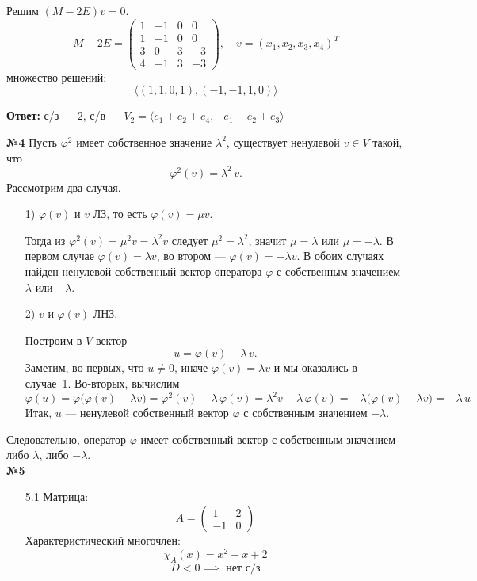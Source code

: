 \documentclass[a4paper]{article}
\begin{document}
\begin{enumerate}
\begin{enumerate}
    Решим \((M-2E)v=0\).  
    \[
    M-2E = 
    \begin{pmatrix}
    1 & -1 & 0 & 0\\
    1 & -1 & 0 & 0\\
    3 &  0 & 3 & -3\\
    4 & -1 & 3 & -3
    \end{pmatrix},
    \quad
    v=(x_1,x_2,x_3,x_4)^T
    \]
    множество решений:
    $$\langle (1, 1, 0, 1), (-1, -1, 1, 0)\rangle$$

    \textbf{Ответ: } с/з --- $2$, с/в --- $V_2 = \langle e_1 + e_2 + e_4, -e_1-e_2+e_3 \rangle$\\


   \end{enumerate}

    \textbf{№4} Пусть \(\varphi^2\) имеет собственное значение \(\lambda^2\), существует ненулевой \(v\in V\) такой, что
    \[
    \varphi^2(v) = \lambda^2\,v.
    \]
    Рассмотрим два случая.
    \begin{enumerate}
      \item[1)]\(\varphi(v)\) и \(v\) ЛЗ, то есть \(\varphi(v)=\mu v\).  
   
      Тогда из \(\varphi^2(v)=\mu^2v=\lambda^2v\) следует \(\mu^2=\lambda^2\), значит \(\mu=\lambda\) или \(\mu=-\lambda\).  
      В первом случае \(\varphi(v)=\lambda v\), во втором — \(\varphi(v)=-\lambda v\).  
      В обоих случаях найден ненулевой собственный вектор оператора \(\varphi\) с собственным значением \(\lambda\) или \(-\lambda\).
    
      \item[2)] \(v\) и \(\varphi(v)\) ЛНЗ. 
      
      Построим в \(V\) вектор
      \[
      u = \varphi(v) - \lambda\,v.
      \]
      Заметим, во‑первых, что \(u\neq0\), иначе \(\varphi(v)=\lambda v\) и мы оказались в случае 1.  
      Во‑вторых, вычислим
      \[
      \varphi(u)
      = \varphi\bigl(\varphi(v) - \lambda v\bigr)
      = \varphi^2(v)-\lambda\,\varphi(v)
      = \lambda^2v - \lambda\,\varphi(v)
      = -\lambda\bigl(\varphi(v)-\lambda v\bigr)
      = -\lambda\,u
      \]
      Итак, \(u\) — ненулевой собственный вектор \(\varphi\) с собственным значением \(-\lambda\).
    \end{enumerate}
    Следовательно, оператор \(\varphi\) имеет собственный вектор с собственным значением либо \(\lambda\), либо \(-\lambda\).\\

    \textbf{№5}\begin{enumerate}
      \item[5.1]Матрица:
      \[
      A = \begin{pmatrix}
      1 & 2\\
      -1 & 0
      \end{pmatrix}
      \]
      Характеристический многочлен:
      \[
      \chi_A(x) = x^2 - x + 2
      \]
      $$D < 0 \implies \text{ нет с/з}$$


\end{enumerate}
\end{enumerate}
\end{document}
